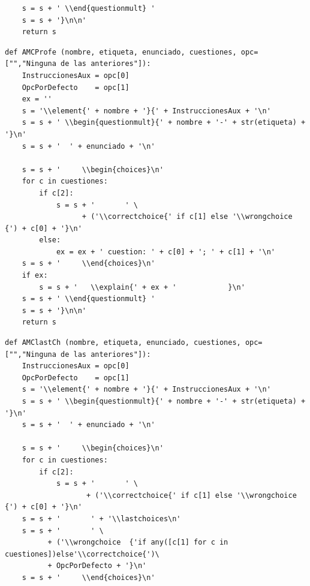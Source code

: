 \documentclass[10pt,a4paper]{report}
\begin{document}
\begin{enumerate}
\begin{verbatim}
    s = s + ' \\end{questionmult} '
    s = s + '}\n\n'
    return s
\end{verbatim}



\begin{verbatim}
def AMCProfe (nombre, etiqueta, enunciado, cuestiones, opc=["","Ninguna de las anteriores"]):
    InstruccionesAux = opc[0]
    OpcPorDefecto    = opc[1]
    ex = ''
    s = '\\element{' + nombre + '}{' + InstruccionesAux + '\n'
    s = s + ' \\begin{questionmult}{' + nombre + '-' + str(etiqueta) + '}\n'
    s = s + '  ' + enunciado + '\n'

    s = s + '     \\begin{choices}\n'
    for c in cuestiones:
        if c[2]:
            s = s + '       ' \
                  + ('\\correctchoice{' if c[1] else '\\wrongchoice  {') + c[0] + '}\n'
        else:
            ex = ex + ' cuestion: ' + c[0] + '; ' + c[1] + '\n'
    s = s + '     \\end{choices}\n'
    if ex:
        s = s + '   \\explain{' + ex + '            }\n'
    s = s + ' \\end{questionmult} '
    s = s + '}\n\n'
    return s
\end{verbatim}

\begin{verbatim}
def AMClastCh (nombre, etiqueta, enunciado, cuestiones, opc=["","Ninguna de las anteriores"]):
    InstruccionesAux = opc[0]
    OpcPorDefecto    = opc[1]
    s = '\\element{' + nombre + '}{' + InstruccionesAux + '\n'
    s = s + ' \\begin{questionmult}{' + nombre + '-' + str(etiqueta) + '}\n'
    s = s + '  ' + enunciado + '\n'

    s = s + '     \\begin{choices}\n'
    for c in cuestiones:
        if c[2]:
            s = s + '       ' \
                   + ('\\correctchoice{' if c[1] else '\\wrongchoice  {') + c[0] + '}\n'
    s = s + '       ' + '\\lastchoices\n'
    s = s + '       ' \
          + ('\\wrongchoice  {'if any([c[1] for c in cuestiones])else'\\correctchoice{')\
          + OpcPorDefecto + '}\n'
    s = s + '     \\end{choices}\n'


\end{verbatim}
\end{enumerate}
\end{document}
